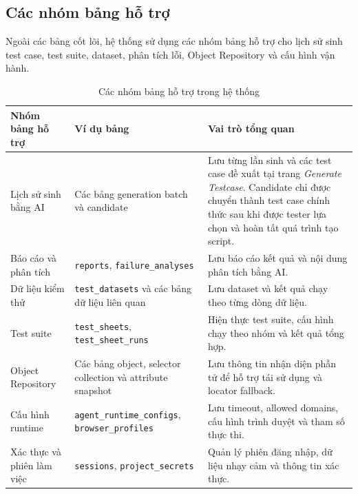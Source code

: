 \subsection{Các nhóm bảng hỗ trợ}

Ngoài các bảng cốt lõi, hệ thống sử dụng các nhóm bảng hỗ trợ cho lịch sử sinh test case, test suite, dataset, phân tích lỗi, Object Repository và cấu hình vận hành.

\begin{table}[H]
\centering
\caption{Các nhóm bảng hỗ trợ trong hệ thống}
\label{tab:chapter4_support_tables}
\renewcommand{\arraystretch}{1.2}
\begin{tabular}{|p{3.8cm}|p{5.2cm}|p{5.2cm}|}
\hline
\textbf{Nhóm bảng hỗ trợ} &
\textbf{Ví dụ bảng} &
\textbf{Vai trò tổng quan} \\
\hline

Lịch sử sinh bằng AI &
Các bảng generation batch và candidate &
Lưu từng lần sinh và các test case đề xuất tại trang \textit{Generate Testcase}. Candidate chỉ được chuyển thành test case chính thức sau khi được tester lựa chọn và hoàn tất quá trình tạo script. \\
\hline

Báo cáo và phân tích &
\texttt{reports}, \texttt{failure\_analyses} &
Lưu báo cáo kết quả và nội dung phân tích bằng AI. \\
\hline

Dữ liệu kiểm thử &
\texttt{test\_datasets} và các bảng dữ liệu liên quan &
Lưu dataset và kết quả chạy theo từng dòng dữ liệu. \\
\hline

Test suite &
\texttt{test\_sheets}, \texttt{test\_sheet\_runs} &
Hiện thực test suite, cấu hình chạy theo nhóm và kết quả tổng hợp. \\
\hline

Object Repository &
Các bảng object, selector collection và attribute snapshot &
Lưu thông tin nhận diện phần tử để hỗ trợ tái sử dụng và locator fallback. \\
\hline

Cấu hình runtime &
\texttt{agent\_runtime\_configs}, \texttt{browser\_profiles} &
Lưu timeout, allowed domains, cấu hình trình duyệt và tham số thực thi. \\
\hline

Xác thực và phiên làm việc &
\texttt{sessions}, \texttt{project\_secrets} &
Quản lý phiên đăng nhập, dữ liệu nhạy cảm và thông tin xác thực. \\
\hline
\end{tabular}
\end{table}

